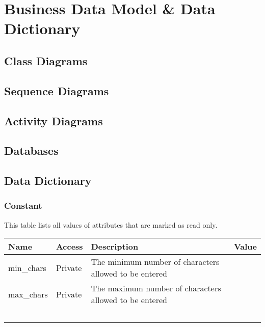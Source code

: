 \newpage
\section{Business Data Model \& Data Dictionary}

\newpage
\subsection{Class Diagrams}

\newpage
\subsection{Sequence Diagrams}

\newpage
\subsection{Activity Diagrams}

\newpage
\subsection{Databases}

\newpage
\subsection{Data Dictionary}

\newpage
\subsubsection{Constant}

This table lists all values of attributes that are marked as read only.

\begin{table}[H]
\centering
\small
    \begin{tabular}{|l|l|l|l|}
    \hline
    \textbf{Name}      & \textbf{Access}  & \textbf{Description}                                            & \textbf{Value} \\ \hline
    min\_chars & Private & The minimum number of characters allowed to be entered & ~     \\ \hline
    max\_chars & Private & The maximum number of characters allowed to be entered & ~     \\ \hline
    ~         & ~       & ~                                                      & ~     \\ \hline
    \end{tabular}
\end{table}

